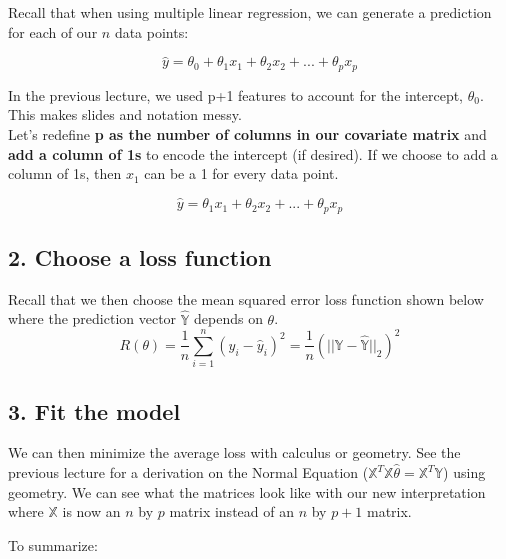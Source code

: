 \documentclass[
  letterpaper,
  DIV=11,
  numbers=noendperiod]{scrreprt}
\begin{document}
Recall that when using multiple linear regression, we can generate a
prediction for each of our \(n\) data points:

\[\hat{y} =\theta_{0} + \theta_{1}x_{1} + \theta_{2}x_{2} + ... + \theta_{p}x_{p}\]

In the previous lecture, we used p+1 features to account for the
intercept, \(\theta_0\). This makes slides and notation messy.\\
Let's redefine \textbf{p as the number of columns in our covariate
matrix} and \textbf{add a column of 1s} to encode the intercept (if
desired). If we choose to add a column of 1s, then \(x_1\) can be a 1
for every data point.

\[\hat{y} =\theta_{1}x_{1} + \theta_{2}x_{2} + ... + \theta_{p}x_{p}\]

\subsection{2. Choose a loss function}\label{choose-a-loss-function}

Recall that we then choose the mean squared error loss function shown
below where the prediction vector \(\hat{\mathbb{Y}}\) depends on
\(\theta\).
\[R(\theta) = \frac{1}{n} \sum_{i=1}^n (y_i - \hat{y}_i)^2 = \frac{1}{n} (||\mathbb{Y} - \hat{\mathbb{Y}}||_2)^2\]

\subsection{3. Fit the model}\label{fit-the-model}

We can then minimize the average loss with calculus or geometry. See the
previous lecture for a derivation on the Normal Equation
(\(\mathbb{X}^T \mathbb{X} \hat{\theta} = \mathbb{X}^T \mathbb{Y}\))
using geometry. We can see what the matrices look like with our new
interpretation where \(\mathbb{X}\) is now an \(n\) by \(p\) matrix
instead of an \(n\) by \(p+1\) matrix.

To summarize:
\end{document}
